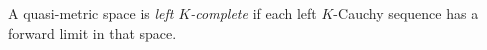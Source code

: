
A quasi-metric space is \emph{left $K$-complete} if each left $K$-Cauchy sequence has a forward limit in that space.
